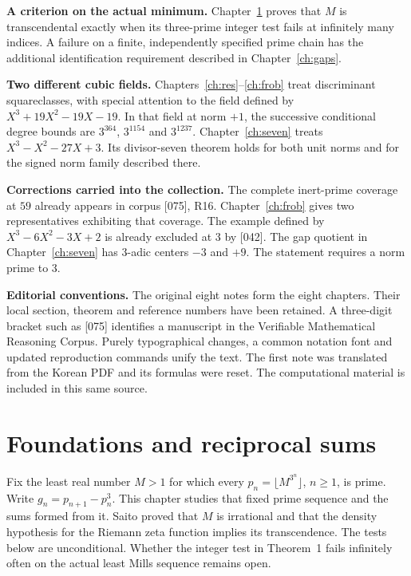 \documentclass[11pt,a4paper,oneside,openany]{book}
\begin{document}
\textbf{A criterion on the actual minimum.} Chapter~\ref{ch:initial} proves that $M$ is transcendental exactly when its three-prime integer test fails at infinitely many indices. A failure on a finite, independently specified prime chain has the additional identification requirement described in Chapter~\ref{ch:gaps}.

\textbf{Two different cubic fields.} Chapters~\ref{ch:res}--\ref{ch:frob} treat discriminant squareclasses, with special attention to the field defined by $X^3+19X^2-19X-19$. In that field at norm $+1$, the successive conditional degree bounds are $3^{364}$, $3^{1154}$ and $3^{1237}$. Chapter~\ref{ch:seven} treats $X^3-X^2-27X+3$. Its divisor-seven theorem holds for both unit norms and for the signed norm family described there.

\textbf{Corrections carried into the collection.} The complete inert-prime coverage at $59$ already appears in corpus [075], R16. Chapter~\ref{ch:frob} gives two representatives exhibiting that coverage. The example defined by $X^3-6X^2-3X+2$ is already excluded at $3$ by [042]. The gap quotient in Chapter~\ref{ch:seven} has $3$-adic centers $-3$ and $+9$. The statement requires a norm prime to $3$.

\textbf{Editorial conventions.} The original eight notes form the eight chapters. Their local section, theorem and reference numbers have been retained. A three-digit bracket such as [075] identifies a manuscript in the Verifiable Mathematical Reasoning Corpus. Purely typographical changes, a common notation font and updated reproduction commands unify the text. The first note was translated from the Korean PDF and its formulas were reset. The computational material is included in this same source.
\mainmatter

\chapter{Foundations and reciprocal sums}\label{ch:initial}
Fix the least real number $M>1$ for which every $p_n=\lfloor M^{3^n}\rfloor$, $n\ge1$, is prime. Write $g_n=p_{n+1}-p_n^3$. This chapter studies that fixed prime sequence and the sums formed from it. Saito proved that $M$ is irrational and that the density hypothesis for the Riemann zeta function implies its transcendence. The tests below are unconditional. Whether the integer test in Theorem~1 fails infinitely often on the actual least Mills sequence remains open.
\end{document}
